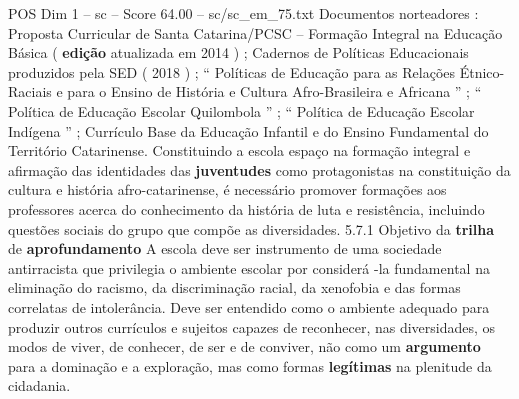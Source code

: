 \begin{textsample}{POS Dim 1 – sc – Score 64.00 – sc/sc\_em\_75.txt}
Documentos norteadores : Proposta Curricular de Santa Catarina/PCSC – Formação Integral na Educação Básica ( \textbf{edição} atualizada em 2014 ) ; Cadernos de Políticas Educacionais produzidos pela SED ( 2018 ) ; “ Políticas de Educação para as Relações Étnico-Raciais e para o Ensino de História e Cultura Afro-Brasileira e Africana ” ; “ Política de Educação Escolar Quilombola ” ; “ Política de Educação Escolar Indígena ” ; Currículo Base da Educação Infantil e do Ensino Fundamental do Território Catarinense.
Constituindo a escola espaço na formação integral e afirmação das identidades das \textbf{juventudes} como protagonistas na constituição da cultura e história afro-catarinense, é necessário promover formações aos professores acerca do conhecimento da história de luta e resistência, incluindo questões sociais do grupo que compõe as diversidades. 5.7.1 Objetivo da \textbf{trilha} de \textbf{aprofundamento} A escola deve ser instrumento de uma sociedade antirracista que privilegia o ambiente escolar por considerá -la fundamental na eliminação do racismo, da discriminação racial, da xenofobia e das formas correlatas de intolerância.
Deve ser entendido como o ambiente adequado para produzir outros currículos e sujeitos capazes de reconhecer, nas diversidades, os modos de viver, de conhecer, de ser e de conviver, não como um \textbf{argumento} para a dominação e a exploração, mas como formas \textbf{legítimas} na plenitude da cidadania.

\end{textsample}
